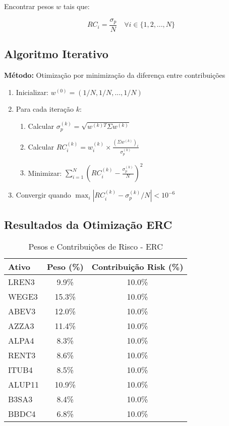 Encontrar pesos $w$ tais que:

\begin{equation}
RC_i = \frac{\sigma_p}{N} \quad \forall i \in \{1, 2, ..., N\}
\end{equation}

\subsection{Algoritmo Iterativo}

\textbf{Método:} Otimização por minimização da diferença entre contribuições

\begin{enumerate}
    \item Inicializar: $w^{(0)} = (1/N, 1/N, ..., 1/N)$
    \item Para cada iteração $k$:
    \begin{enumerate}
        \item Calcular $\sigma_p^{(k)} = \sqrt{w^{(k)T} \Sigma w^{(k)}}$
        \item Calcular $RC_i^{(k)} = w_i^{(k)} \times \frac{(\Sigma w^{(k)})_i}{\sigma_p^{(k)}}$
        \item Minimizar: $\sum_{i=1}^{N} \left(RC_i^{(k)} - \frac{\sigma_p^{(k)}}{N}\right)^2$
    \end{enumerate}
    \item Convergir quando $\max_i |RC_i^{(k)} - \sigma_p^{(k)}/N| < 10^{-6}$
\end{enumerate}

\subsection{Resultados da Otimização ERC}

\begin{table}[H]
\centering
\caption{Pesos e Contribuições de Risco - ERC}
\begin{tabular}{|l|c|c|}
\hline
\textbf{Ativo} & \textbf{Peso (\%)} & \textbf{Contribuição Risk (\%)} \\
\hline
LREN3 & 9.9\% & 10.0\% \\
WEGE3 & 15.3\% & 10.0\% \\
ABEV3 & 12.0\% & 10.0\% \\
AZZA3 & 11.4\% & 10.0\% \\
ALPA4 & 8.3\% & 10.0\% \\
RENT3 & 8.6\% & 10.0\% \\
ITUB4 & 8.5\% & 10.0\% \\
ALUP11 & 10.9\% & 10.0\% \\
B3SA3 & 8.4\% & 10.0\% \\
BBDC4 & 6.8\% & 10.0\% \\
\hline
\end{tabular}
\end{table}

